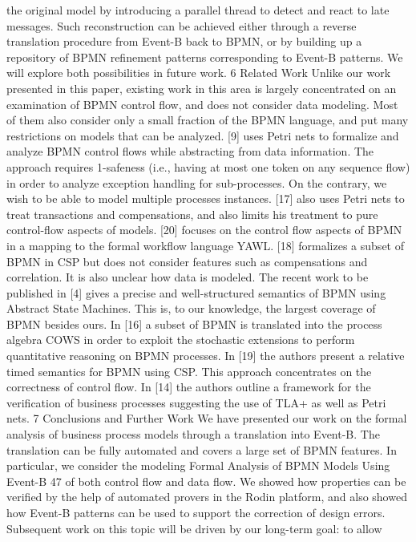 the original model by introducing a parallel thread to detect and react to late
messages. Such reconstruction can be achieved either through a reverse translation procedure from Event-B back to BPMN, or by building up a repository of
BPMN refinement patterns corresponding to Event-B patterns. We will explore
both possibilities in future work.
6 Related Work
Unlike our work presented in this paper, existing work in this area is largely concentrated on an examination of BPMN control flow, and does not consider data
modeling. Most of them also consider only a small fraction of the BPMN language, and put many restrictions on models that can be analyzed. [9] uses Petri
nets to formalize and analyze BPMN control flows while abstracting from data
information. The approach requires 1-safeness (i.e., having at most one token
on any sequence flow) in order to analyze exception handling for sub-processes.
On the contrary, we wish to be able to model multiple processes instances. [17]
also uses Petri nets to treat transactions and compensations, and also limits
his treatment to pure control-flow aspects of models. [20] focuses on the control
flow aspects of BPMN in a mapping to the formal workflow language YAWL.
[18] formalizes a subset of BPMN in CSP but does not consider features such
as compensations and correlation. It is also unclear how data is modeled. The
recent work to be published in [4] gives a precise and well-structured semantics
of BPMN using Abstract State Machines. This is, to our knowledge, the largest
coverage of BPMN besides ours. In [16] a subset of BPMN is translated into
the process algebra COWS in order to exploit the stochastic extensions to perform quantitative reasoning on BPMN processes. In [19] the authors present a
relative timed semantics for BPMN using CSP. This approach concentrates on
the correctness of control flow. In [14] the authors outline a framework for the
verification of business processes suggesting the use of TLA+ as well as Petri
nets.
7 Conclusions and Further Work
We have presented our work on the formal analysis of business process models through a translation into Event-B. The translation can be fully automated
and covers a large set of BPMN features. In particular, we consider the modeling
Formal Analysis of BPMN Models Using Event-B 47
of both control flow and data flow. We showed how properties can be verified
by the help of automated provers in the Rodin platform, and also showed how
Event-B patterns can be used to support the correction of design errors.
Subsequent work on this topic will be driven by our long-term goal: to allow
